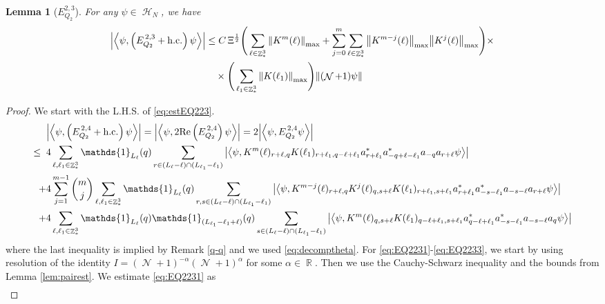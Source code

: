 \documentclass[sn-mathphys, Numbered ,a4paper]{sn-jnl}%
\DeclareMathOperator{\R}{\mathbb{R}}
\DeclareMathOperator{\Z}{\mathbb{Z}}
\DeclareMathOperator{\HH}{\mathcal{H}}
\DeclareMathOperator{\NN}{\mathcal{N}}
\newcommand{\half}{\frac{1}{2}}
\newcommand{\eva}[1]{\left\langle #1 \right\rangle}
\theoremstyle{plain}
\newtheorem{lemma}[theorem]{Lemma}
\theoremstyle{definition}
\theoremstyle{remark}
\theoremstyle{plain}
\theoremstyle{definition}
\theoremstyle{remark}
\begin{document}
\begin{lemma}[$E_{Q_2}^{2,3}$]
	For any $\psi \in \HH_N$, we have
	\begin{align}
		\abs{\eva{\psi,\left(E^{\,2,3}_{Q_2}+\mathrm{h.c.}\right) \psi }}
		&\leq  C\, \Xi^{\half} \Bigg(\sum\limits_{\ell \in \Z^3_*} \norm{K^m(\ell)}_{\mathrm{max}} + \sum\limits_{j=0}^m \sum\limits_{\ell \in \Z^3_*}\norm{K^{m-j}(\ell)}_{\mathrm{max}}\norm{K^{j}(\ell)}_{\mathrm{max}}\Bigg)\times\nonumber\\&\quad\times \Bigg( \sum\limits_{\ell_1 \in \Z^3_*}\norm{K(\ell_1)}_{\mathrm{max}} \Bigg)  \norm { (\NN+1) \psi }  \label{eq:estEQ223}
	\end{align}
\end{lemma}
\begin{proof}
	We start with the L.H.S. of \eqref{eq:estEQ223}.
	\begin{align}
		&\abs{\eva{\psi,\left(E^{\,2,4}_{Q_2}+\mathrm{h.c.}\right) \psi }} = \abs{\eva{\psi,2\mathrm{Re}\left(E^{\,2,4}_{Q_2}\right) \psi }} = 2\abs{\eva{\psi, E^{\,2,4}_{Q_2} \psi }}\nonumber\\
		\leq\;\;&4 \sum\limits_{\ell, \ell_1\in \Z^3_*} \mathds{1}_{L_{\ell}}(q) \sum\limits_{r \in (L_{\ell}-\ell) \cap (L_{\ell_1}-\ell_1)} \abs{\eva{\psi, K^m(\ell)_{r+\ell,q} K(\ell_1)_{r+\ell_1,q-\ell+\ell_1}  a^*_{r+\ell_1}a^*_{-q+\ell-\ell_1}a_{-q}a_{r+\ell} \psi}} \label{eq:EQ2231}\\
		\;+&4 \sum\limits_{j=1}^{m-1} {{m}\choose j} \sum\limits_{\ell, \ell_1\in \Z^3_*}\mathds{1}_{L_{\ell}}(q) \sum\limits_{r,s \in (L_{\ell}-\ell) \cap (L_{\ell_1}-\ell_1)}  \abs{\eva{\psi, K^{m-j}(\ell)_{r+\ell, q} K^{j}(\ell)_{q,s+\ell} K(\ell_1)_{r+\ell_1,s+\ell_1}  a^*_{r+\ell_1}a^*_{-s-\ell_1}a_{-s-\ell}a_{r+\ell} \psi }} \label{eq:EQ2232}\\
		\;+&4\sum\limits_{\ell, \ell_1\in \Z^3_*} \mathds{1}_{L_{\ell}}(q) \mathds{1}_{(L_{\ell_1}-\ell_1+\ell)}(q) \sum\limits_{s \in (L_{\ell}-\ell) \cap (L_{\ell_1}-\ell_1)} \abs{\eva{\psi, K^m(\ell)_{q,s+\ell} K(\ell_1)_{q-\ell+\ell_1,s+\ell_1}  a^*_{q-\ell+\ell_1}a^*_{-s-\ell_1}a_{-s-\ell}a_{q} \psi}} \label{eq:EQ2233}
	\end{align}
	where the last inequality is implied by Remark \ref{q-q} and we used \eqref{eq:decomptheta}.
	For \eqref{eq:EQ2231}-\eqref{eq:EQ2233}, we start by using resolution of the identity $I = (\NN+1)^{-\alpha}(\NN+1)^{\alpha}$ for some $\alpha \in \R$. Then we use the Cauchy-Schwarz inequality and the bounds from Lemma \ref{lem:pairest}.
	We estimate \eqref{eq:EQ2231} as 
	\begin{align}

\end{align}
\end{proof}
\end{document}
